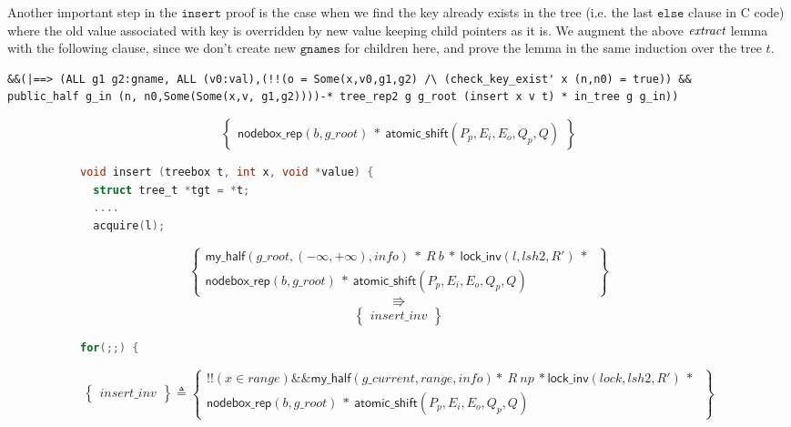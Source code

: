 \documentclass[acmsmall,screen]{acmart}\settopmatter{printfolios=true}
\begin{document}
Another important step in the $\texttt{insert}$ proof is the case when we find the key already exists in the tree (i.e. the last $\texttt{else}$ clause in C code) where the old value associated with key is overridden by new value keeping child pointers as it is. We augment the above $\emph{extract}$ lemma with the following clause, since we don't create new $\texttt{gnames}$ for children here, and prove the lemma in the same induction over the tree $t$.
\begin{verbatim}
&&(|==> (ALL g1 g2:gname, ALL (v0:val),(!!(o = Some(x,v0,g1,g2) /\ (check_key_exist' x (n,n0) = true)) && 
public_half g_in (n, n0,Some(Some(x,v, g1,g2))))-* tree_rep2 g g_root (insert x v t) * in_tree g g_in))
 \end{verbatim}
  
\begin{figure}[htp]
\begin{subfigure}[t]{1\textwidth}
 $$\left\{\begin{array}{l} \mathsf{nodebox\_rep}(b,g\_root)\ *\ \mathsf{atomic\_shift}(P_p,E_i,E_o,Q_p,Q)\end{array}\right\}$$
 \vspace*{-10pt}
\begin{lstlisting}[language = C]
void insert (treebox t, int x, void *value) {
  struct tree_t *tgt = *t;
  ....
  acquire(l);
 \end{lstlisting}  
 $$\left\{\begin{array}{l} \mathsf{my\_half}(g\_root,(-\infty,+\infty),info)\ *\ R\ b\ *\ \mathsf{lock\_inv}(l,lsh2,R')\ *\ \\
 \mathsf{nodebox\_rep}(b,g\_root)\ *\ \mathsf{atomic\_shift}(P_p,E_i,E_o,Q_p,Q)\end{array}\right\}$$ $$\Rrightarrow$$  $$\left\{\begin{array}{l} insert\_inv \end{array}\right\}$$ 
  \vspace*{-10pt}
  \begin{lstlisting}[language = C]
  for(;;) {
       \end{lstlisting}   
   $$\left\{\begin{array}{l} insert\_inv \end{array}\right\} \triangleq \left\{\begin{array}{l}!!(x\in range)\&\&\mathsf{my\_half}(g\_current,range,info)*\ R\ np\ *\mathsf{lock\_inv}(lock,lsh2,R')\ *\ \\\mathsf{nodebox\_rep}(b,g\_root)\ *\ \mathsf{atomic\_shift}(P_p,E_i,E_o,Q_p,Q)\end{array}\right\}$$

\end{subfigure}
\end{figure}
\end{document}
